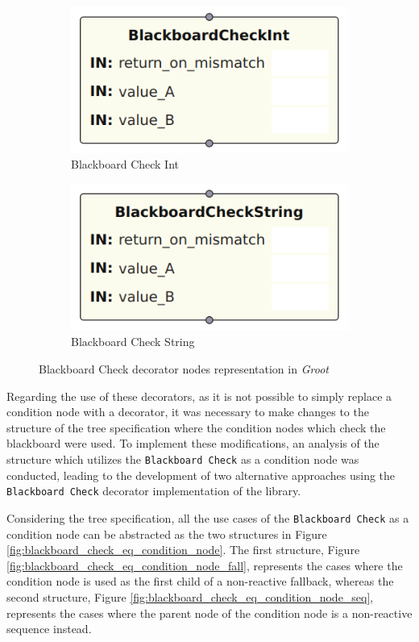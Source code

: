 \begin{figure}[!h]
    \centering
    \begin{subfigure}[b]{.49\linewidth}
        \centering
        \includegraphics[width=0.65\linewidth]{images/implementation/BlackboardCheckIntNode.png}
        \caption{Blackboard Check Int}
        \label{fig:blackboard_check_int_impl}
    \end{subfigure}
    \hfill
    \begin{subfigure}[b]{.49\linewidth}
        \centering
        \includegraphics[width=0.65\linewidth]{images/implementation/BlackboardCheckStringNode.png}
        \caption{Blackboard Check String}
        \label{fig:blackboard_check_string_impl}
    \end{subfigure}
    \caption{Blackboard Check decorator nodes representation in \textit{Groot}}
    \label{fig:common_decorator_nodes_impl}
\end{figure}

Regarding the use of these decorators, as it is not possible to simply replace a condition node with a decorator, it was necessary to make changes to the structure of the tree specification where the condition nodes which check the blackboard were used. To implement these modifications, an analysis of the structure which utilizes the \texttt{Blackboard Check} as a condition node was conducted, leading to the development of two alternative approaches using the \texttt{Blackboard Check} decorator implementation of the library. 

Considering the tree specification, all the use cases of the \texttt{Blackboard Check} as a condition node can be abstracted as the two structures in Figure \ref{fig:blackboard_check_eq_condition_node}. The first structure, Figure \ref{fig:blackboard_check_eq_condition_node_fall}, represents the cases where the condition node is used as the first child of a non-reactive fallback, whereas the second structure, Figure \ref{fig:blackboard_check_eq_condition_node_seq}, represents the cases where the parent node of the condition node is a non-reactive sequence instead.

